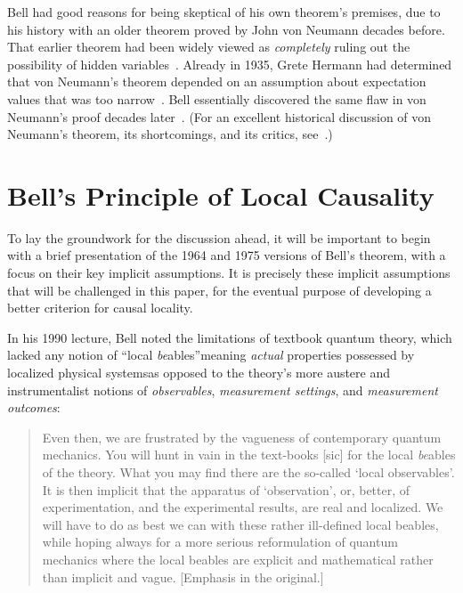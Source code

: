 \documentclass[twoside,twocolumn,english,prl,superscriptaddress,nobibnotes,nofootinbib]{revtex4-2}
\begin{document}
Bell had good reasons for being skeptical of his own theorem's premises,
due to his history with an older theorem proved by John von Neumann
decades before. That earlier theorem had been widely viewed as \emph{completely}
ruling out the possibility of hidden variables~\citep{vonNeumann:1927wadq,vonNeumann:1932mgdq,vonNeumann:2018mfoqmne}.
 Already in 1935, Grete Hermann had determined that von Neumann's
theorem depended on an assumption about expectation values that was
too narrow~\citep{hermann1935circularity,Seevinck:2017ctgghovnsnhvp}.
Bell essentially discovered the same flaw in von Neumann's proof decades
later~\citep{Bell:1966otpohviqm}. (For an excellent historical discussion
of von Neumann's theorem, its shortcomings, and its critics, see~\citep{Bacciagaluppi:2021tsibhavn12}.)

\section{Bell's Principle of Local Causality\label{sec:Bell's-Principle-of-Local-Causality}}

To lay the groundwork for the discussion ahead, it will be important
to begin with a brief presentation of the 1964 and 1975 versions of
Bell's theorem, with a focus on their key implicit assumptions. It
is precisely these implicit assumptions that will be challenged in
this paper,  for the eventual purpose of developing a better criterion
for causal locality.

In his 1990 lecture, Bell noted the limitations of textbook quantum
theory, which lacked any notion of ``local \emph{be}ables''\textemdash meaning
\emph{actual} properties possessed by localized physical systems\textemdash as
opposed to the theory's more austere and instrumentalist notions of
\emph{observables}, \emph{measurement settings}, and \emph{measurement outcomes}:
\begin{quotation}
Even then, we are frustrated by the vagueness of contemporary quantum
mechanics. You will hunt in vain in the text-books {[}sic{]} for the
local \emph{be}ables of the theory. What you may find there are the
so-called \textquoteleft local observables\textquoteright . It is
then implicit that the apparatus of \textquoteleft observation\textquoteright ,
or, better, of experimentation, and the experimental results, are
real and localized. We will have to do as best we can with these rather
ill-defined local beables, while hoping always for a more serious
reformulation of quantum mechanics where the local beables are explicit
and mathematical rather than implicit and vague. {[}Emphasis in the
original.{]}~\citep{Bell:1990lnc}
\end{quotation}
\end{document}
